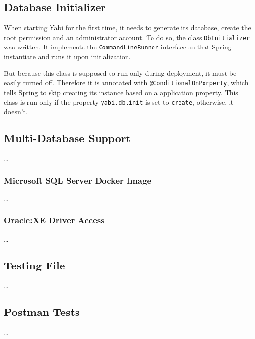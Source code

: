 \subsection{Database Initializer}
When starting \gls{Yabi} for the first time, it needs to generate its database, create the root permission and an administrator account.
To do so, the class \texttt{DbInitializer} was written. It implements the \texttt{CommandLineRunner} interface so that Spring instantiate and runs it upon initialization.

But because this class is supposed to run only during deployment, it must be easily turned off. Therefore it is annotated with \texttt{@ConditionalOnPorperty}, which tells Spring to skip creating its instance based on a application property.
This class is run only if the property \texttt{yabi.db.init} is set to \texttt{create}, otherwise, it doesn't.

\subsection{Multi-Database Support}
\dots
\subsubsection{Microsoft SQL Server Docker Image}
\dots
\subsubsection{Oracle:XE Driver Access}
\dots
\subsection{Testing File}
\dots
\subsection{Postman Tests}
\dots

